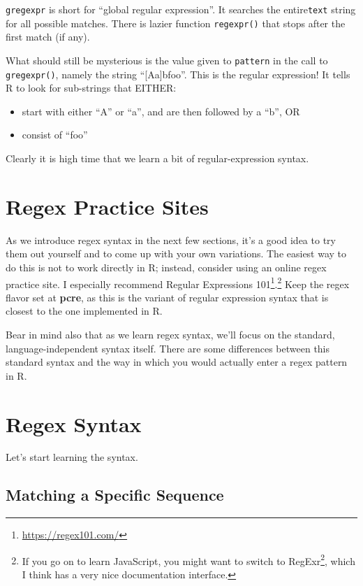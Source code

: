 \documentclass[]{book}
\providecommand{\tightlist}{%
  \setlength{\itemsep}{0pt}\setlength{\parskip}{0pt}}
\let\rmarkdownfootnote\footnote%
\def\footnote{\protect\rmarkdownfootnote}
\renewcommand{\href}[2]{#2\footnote{\url{#1}}}
\renewcommand{\href}[2]{#2\footnote{\url{#1}}}
\theoremstyle{definition}
\theoremstyle{definition}
\theoremstyle{remark}
\begin{document}
{\texttt{gregexpr} is short for ``global regular expression''. It
searches the entire\texttt{text} string for all possible matches. There
is lazier function \texttt{regexpr()}
that stops after the
first match (if any).

What should still be mysterious is the value given to \texttt{pattern}
in the call to \texttt{gregexpr()}, namely the string
``{[}Aa{]}b\textbar{}foo''. This is the regular expression! It tells R
to look for sub-strings that EITHER:

\begin{itemize}
\tightlist
\item
  start with either ``A'' or ``a'', and are then followed by a ``b'', OR
\item
  consist of ``foo''
\end{itemize}

Clearly it is high time that we learn a bit of regular-expression
syntax.

\section{Regex Practice Sites}\label{regex-practice-sites}

As we introduce regex syntax in the next few sections, it's a good idea
to try them out yourself and to come up with your own variations. The
easiest way to do this is not to work directly in R; instead, consider
using an online regex practice site. I especially recommend
\href{https://regex101.com/}{Regular Expressions 101}.\footnote{If you
  go on to learn JavaScript, you might want to switch to
  \href{http://regexr.com/}{RegExr}, which I think has a very nice
  documentation interface.} Keep the regex flavor set at \textbf{pcre},
as this is the variant of regular expression syntax that is closest to
the one implemented in R.

Bear in mind also that as we learn regex syntax, we'll focus on the
standard, language-independent syntax itself. There are some differences
between this standard syntax and the way in which you would actually
enter a regex pattern in R.

\section{Regex Syntax}\label{regex-syntax}

Let's start learning the syntax.

\subsection{Matching a Specific
Sequence}\label{matching-a-specific-sequence}

}
\end{document}
